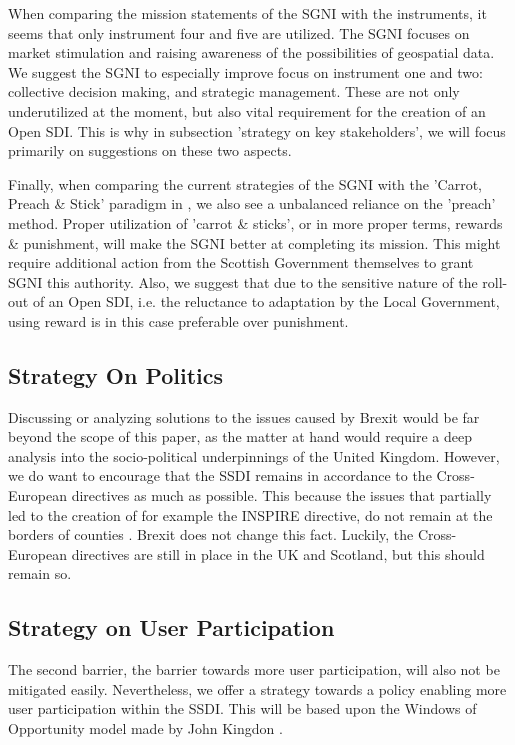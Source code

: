 When comparing the mission statements of the SGNI with the instruments, it seems that only instrument four and five are utilized. The SGNI focuses on market stimulation and raising awareness of the possibilities of geospatial data. We suggest the SGNI to especially improve focus on instrument one and two: collective decision making, and strategic management. These are not only underutilized at the moment, but also vital requirement for the creation of an Open SDI. This is why in subsection 'strategy on key stakeholders', we will focus primarily on suggestions on these two aspects. 

Finally, when comparing the current strategies of the SGNI with the 'Carrot, Preach \& Stick' paradigm in \citep{gov_instruments}, we also see a unbalanced reliance on the 'preach' method. Proper utilization of 'carrot \& sticks', or in more proper terms, rewards \& punishment, will make the SGNI better at completing its mission. This might require additional action from the Scottish Government themselves to grant SGNI this authority. Also, we suggest that due to the sensitive nature of the roll-out of an Open SDI, i.e. the reluctance to adaptation by the Local Government, using reward is in this case preferable over punishment. 


\subsection{Strategy On Politics}

Discussing or analyzing solutions to the issues caused by Brexit would be far beyond the scope of this paper, as the matter at hand would require a deep analysis into the socio-political underpinnings of the United Kingdom. However, we do want to encourage that the SSDI remains in accordance to the Cross-European directives as much as possible. This because the issues that partially led to the creation of for example the INSPIRE directive, do not remain at the borders of counties \citep{inspire_background}. Brexit does not change this fact. Luckily, the Cross-European directives are still in place in the UK and Scotland, but this should remain so.


\subsection{Strategy on User Participation}

The second barrier, the barrier towards more user participation, will also not be mitigated easily. Nevertheless, we offer a strategy towards a policy enabling more user participation within the SSDI. This will be based upon the Windows of Opportunity model made by John Kingdon \citep{kingdon}.

